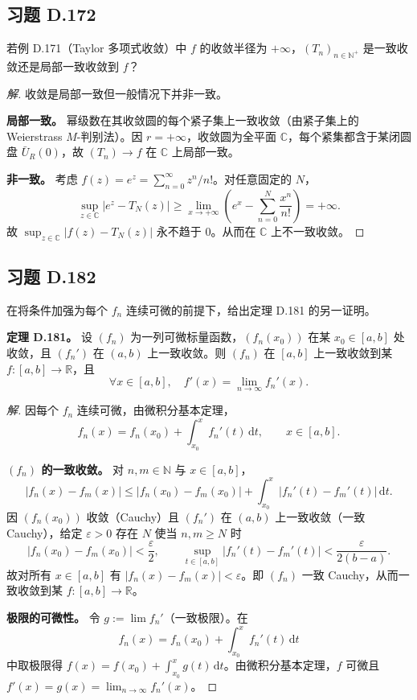 \documentclass[11pt,a4paper]{article}
\newcommand{\R}{\mathbb{R}}
\newcommand{\C}{\mathbb{C}}
\newcommand{\N}{\mathbb{N}}
\newcommand{\dd}{\mathrm{d}}
\newcommand{\eps}{\varepsilon}
\theoremstyle{definition}
\newenvironment{solution}{\begin{proof}[解]}{\end{proof}}
\begin{document}
\subsection{习题 D.172}

若例 D.171（Taylor 多项式收敛）中 $f$ 的收敛半径为 $+\infty$，$(T_n)_{n \in \N^+}$ 是一致收敛还是局部一致收敛到 $f$？

\begin{solution}
  收敛是局部一致但一般情况下并非一致。

  \textbf{局部一致。}\;
  幂级数在其收敛圆的每个紧子集上一致收敛（由紧子集上的 Weierstrass $M$-判别法）。因 $r = +\infty$，收敛圆为全平面 $\C$，每个紧集都含于某闭圆盘 $\bar{U}_R(0)$，故 $(T_n) \to f$ 在 $\C$ 上局部一致。

  \textbf{非一致。}\;
  考虑 $f(z) = e^z = \sum_{n=0}^{\infty} z^n/n!$。对任意固定的 $N$，
  \[
    \sup_{z \in \C}\left|e^z - T_N(z)\right|
    \ge \lim_{x \to +\infty}\left(e^x - \sum_{n=0}^{N}\frac{x^n}{n!}\right)
    = +\infty.
  \]
  故 $\sup_{z \in \C}|f(z) - T_N(z)|$ 永不趋于 $0$。从而在 $\C$ 上不一致收敛。\qedhere
\end{solution}

\subsection{习题 D.182}

在将条件加强为每个 $f_n$ 连续可微的前提下，给出定理 D.181 的另一证明。

\textbf{定理 D.181。}
设 $(f_n)$ 为一列可微标量函数，$(f_n(x_0))$ 在某 $x_0 \in [a,b]$ 处收敛，且 $(f_n')$ 在 $(a,b)$ 上一致收敛。则 $(f_n)$ 在 $[a,b]$ 上一致收敛到某 $f \colon [a,b] \to \R$，且
\[
  \forall x \in [a,b],\quad f'(x) = \lim_{n \to \infty} f_n'(x).
\]

\begin{solution}
  因每个 $f_n$ 连续可微，由微积分基本定理，
  \[
    f_n(x) = f_n(x_0) + \int_{x_0}^x f_n'(t)\,\dd t,
    \qquad x \in [a,b].
  \]

  \textbf{$(f_n)$ 的一致收敛。}\;
  对 $n, m \in \N$ 与 $x \in [a,b]$，
  \[
    |f_n(x) - f_m(x)|
    \le |f_n(x_0) - f_m(x_0)|
    + \int_{x_0}^x |f_n'(t) - f_m'(t)|\,\dd t.
  \]
  因 $(f_n(x_0))$ 收敛（Cauchy）且 $(f_n')$ 在 $(a,b)$ 上一致收敛（一致 Cauchy），给定 $\eps > 0$ 存在 $N$ 使当 $n,m \ge N$ 时
  \[
    |f_n(x_0) - f_m(x_0)| < \frac{\eps}{2},
    \qquad
    \sup_{t \in [a,b]} |f_n'(t) - f_m'(t)|
    < \frac{\eps}{2(b-a)}.
  \]
  故对所有 $x \in [a,b]$ 有 $|f_n(x) - f_m(x)| < \eps$。即 $(f_n)$ 一致 Cauchy，从而一致收敛到某 $f \colon [a,b] \to \R$。

  \textbf{极限的可微性。}\;
  令 $g := \lim f_n'$（一致极限）。在
  \[
    f_n(x) = f_n(x_0) + \int_{x_0}^x f_n'(t)\,\dd t
  \]
  中取极限得 $f(x) = f(x_0) + \int_{x_0}^x g(t)\,\dd t$。由微积分基本定理，$f$ 可微且 $f'(x) = g(x) = \lim_{n\to\infty} f_n'(x)$。\qedhere
\end{solution}
\end{document}
